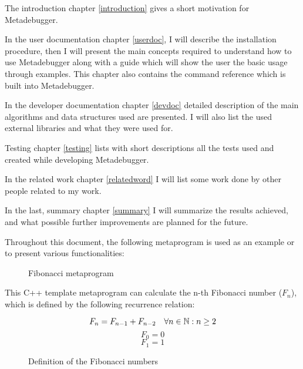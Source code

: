 The introduction chapter \ref{introduction} gives a short motivation for
Metadebugger.

In the user documentation chapter \ref{userdoc}, I will describe the
installation procedure, then I will present the main concepts required to
understand how to use Metadebugger along with a guide which will show the user
the basic usage through examples. This chapter also contains the command
reference which is built into Metadebugger.

In the developer documentation chapter \ref{devdoc} detailed description of the
main algorithms and data structures used are presented. I will also list the
used external libraries and what they were used for.

Testing chapter \ref{testing} lists with short descriptions all the tests used
and created while developing Metadebugger.

In the related work chapter \ref{relatedword} I will list some work done by
other people related to my work.

In the last, summary chapter \ref{summary} I will summarize the results
achieved, and what possible further improvements are planned for the future.

Throughout this document, the following metaprogram is used as an example or to
present various functionalities:

\begin{figure}[H]
    \caption{Fibonacci metaprogram}
\end{figure}

This C++ template metaprogram can calculate the n-th Fibonacci number
(\(F_n\)), which is defined by the following recurrence relation:

\begin{figure}[H]
    \[
        F_n = F_{n-1} + F_{n-2} \quad \forall n \in \mathbb{N}: n \geq 2 \\
    \]
    \[
        F_0 = 0
    \]
    \[
        F_1 = 1
    \]
    \caption{Definition of the Fibonacci numbers}
\end{figure}
